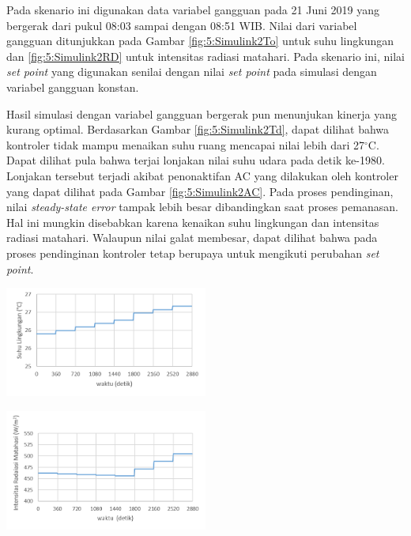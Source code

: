 \documentclass[a4paper,10pt]{article}
\makeatletter
\newenvironment{body}{\begin{multicols}{2}}{\end{multicols}}
\renewenvironment{figure}
{\def\@captype{figure}%
	\captionsetup{labelsep=period,format=hang,font=footnotesize,justification=justified}
}
{}
\makeatother
\begin{document}
\begin{body}
		Pada skenario ini digunakan data variabel gangguan pada 21 Juni 2019 yang bergerak dari pukul 08:03 sampai dengan 08:51 WIB. Nilai dari variabel gangguan ditunjukkan pada Gambar \ref{fig:5:Simulink2To} untuk suhu lingkungan dan \ref{fig:5:Simulink2RD} untuk intensitas radiasi matahari. Pada skenario ini, nilai \textit{set point} yang digunakan senilai dengan nilai \textit{set point} pada simulasi dengan variabel gangguan konstan.
		
		Hasil simulasi dengan variabel gangguan bergerak pun menunjukan kinerja yang kurang optimal. Berdasarkan Gambar \ref{fig:5:Simulink2Td}, dapat dilihat bahwa kontroler tidak mampu menaikan suhu ruang mencapai nilai lebih dari 27$^\circ$C. Dapat dilihat pula bahwa terjai lonjakan nilai suhu udara pada detik ke-1980. Lonjakan tersebut terjadi akibat penonaktifan AC yang dilakukan oleh kontroler yang dapat dilihat pada Gambar \ref{fig:5:Simulink2AC}. Pada proses pendinginan, nilai \textit{steady-state error} tampak lebih besar dibandingkan saat proses pemanasan. Hal ini mungkin disebabkan karena kenaikan suhu lingkungan dan intensitas radiasi matahari. Walaupun nilai galat membesar, dapat dilihat bahwa pada proses pendinginan kontroler tetap berupaya untuk mengikuti perubahan \textit{set point}.\\
		
		\begin{figure}
			\centering
			\includegraphics[width=0.5\textwidth]{figures/Simulink2To}
			\caption{Grafik Nilai Variabel Gangguan Suhu Lingkungan}
			\label{fig:5:Simulink2To}
		\end{figure}
		
		\begin{figure}
			\centering
			\includegraphics[width=0.5\textwidth]{figures/Simulink2RD}
			\caption{Grafik Nilai Variabel Gangguan Intensitas Radiasi Matahari}
			\label{fig:5:Simulink2RD}
		\end{figure}
		\vspace{1em}
		

\end{body}
\end{document}
